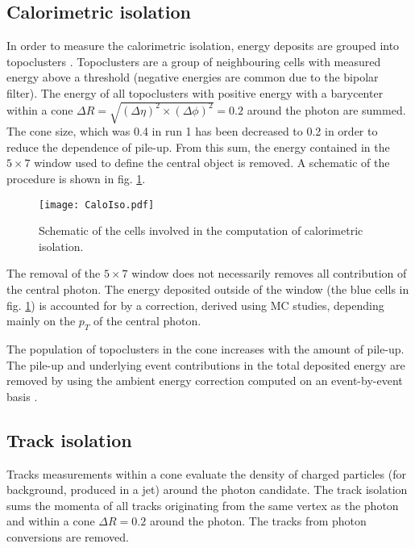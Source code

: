 \subsection{Calorimetric isolation}
\label{sec:org1f421d1}

In order to measure the calorimetric isolation, energy deposits are grouped into topoclusters \cite{ATL-LARG-PUB-2008-002}.
Topoclusters are a group of neighbouring cells with measured energy above a threshold (negative energies are common due to the bipolar filter).
The energy of all topoclusters with positive energy with a barycenter within a cone $\Delta R = \sqrt{(\Delta \eta)^2 \times ( \Delta \phi)^2 }=0.2$ around the photon are summed.
The cone size, which was 0.4 in run 1 has been decreased to 0.2 in order to reduce the dependence of pile-up.
From this sum, the energy contained in the \(5\times 7\) window used to define the central object is removed.
A schematic of the procedure is shown in fig. \ref{fig:org3b7cde6}.

\begin{figure}[htbp]
\centering
\texttt{[image: CaloIso.pdf]}
\caption{\label{fig:org3b7cde6}
Schematic of the cells involved in the computation of calorimetric isolation. \cite{ATL-COM-PHYS-2012-467}}
\end{figure}


The removal of the \(5\times 7\) window does not necessarily removes all contribution of the central photon.
The energy deposited outside of the window (the blue cells in fig. \ref{fig:org3b7cde6}) is accounted for by a correction, derived using MC studies,  depending mainly on the $p_T$ of the central photon.

The population of topoclusters in the cone increases with the amount of pile-up.
The pile-up and underlying event contributions in the total deposited energy are removed by using the ambient energy correction computed on an event-by-event basis \cite{ATL-COM-PHYS-2012-467}.


\subsection{Track isolation}
  \label{sec:orga378fc3}

Tracks measurements within a cone evaluate the density of charged particles (for background, produced in a jet) around the photon candidate.
The track isolation sums the momenta of all tracks originating from the same vertex as the photon and within a cone \(\Delta R=0.2\) around the photon.
The tracks from photon conversions are removed.

